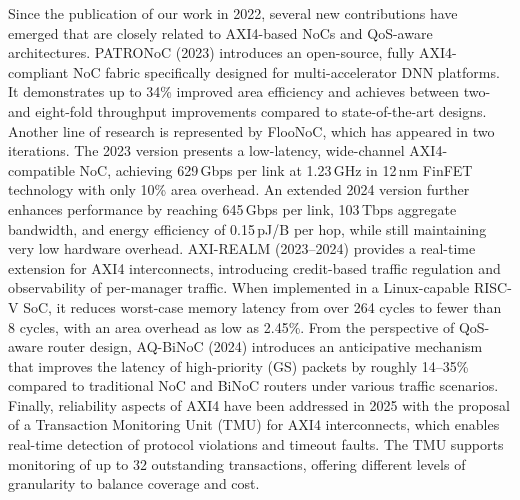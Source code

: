 Since the publication of our work in 2022, several new contributions have emerged that are closely related to AXI4-based NoCs and QoS-aware architectures. PATRONoC (2023) introduces an open-source, fully AXI4-compliant NoC fabric specifically designed for multi-accelerator DNN platforms. It demonstrates up to 34\% improved area efficiency and achieves between two- and eight-fold throughput improvements compared to state-of-the-art designs. 
Another line of research is represented by FlooNoC, which has appeared in two iterations. The 2023 version presents a low-latency, wide-channel AXI4-compatible NoC, achieving 629\,Gbps per link at 1.23\,GHz in 12\,nm FinFET technology with only 10\% area overhead. 
An extended 2024 version further enhances performance by reaching 645\,Gbps per link, 103\,Tbps aggregate bandwidth, and energy efficiency of 0.15\,pJ/B per hop, while still maintaining very low hardware overhead. 
AXI-REALM (2023--2024) provides a real-time extension for AXI4 interconnects, introducing credit-based traffic regulation and observability of per-manager traffic.
When implemented in a Linux-capable RISC-V SoC, it reduces worst-case memory latency from over 264 cycles to fewer than 8 cycles, with an area overhead as low as 2.45\%. 
From the perspective of QoS-aware router design, AQ-BiNoC (2024) introduces an anticipative mechanism that improves the latency of high-priority (GS) packets by roughly 14--35\% compared to traditional NoC and BiNoC routers under various traffic scenarios. 
Finally, reliability aspects of AXI4 have been addressed in 2025 with the proposal of a Transaction Monitoring Unit (TMU) for AXI4 interconnects, which enables real-time detection of protocol violations and timeout faults. 
The TMU supports monitoring of up to 32 outstanding transactions, offering different levels of granularity to balance coverage and cost.
